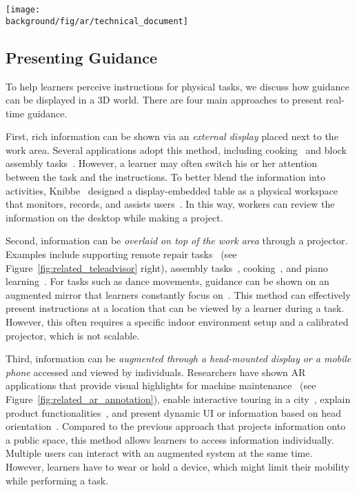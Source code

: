 \begin{figure*}[t!]
  \centering
  \texttt{[image: \\background/fig/ar/technical\_document]}
  \caption{Work by Mohr \ea{}~\cite{Mohr:2015:RTD:2702123.2702490} automatically analyzes a technical document and augments a machine with AR animation in 3D.}
  \label{fig:related_ar_annotation}
\end{figure*}

\subsection{Presenting Guidance}
To help learners perceive instructions for physical tasks, we discuss how guidance can be displayed in a 3D world. There are four main approaches to present real-time guidance.

First, rich information can be shown via an \emph{external display} placed next to the work area. Several applications adopt this method, including cooking~\cite{Uriu:2012:PRM:2207676.2207695} and block assembly tasks~\cite{Gupta2012DuploTrack,Wu:2016:ARI:2856400.2856416}. However, a learner may often switch his or her attention between the task and the instructions. To better blend the information into activities, Knibbe~\ea{} designed a display-embedded table as a physical workspace that monitors, records, and assists users~\cite{Knibbe:2015:SMI:2817721.2817741}. In this way, workers can review the information on the desktop while making a project.

Second, information can be \emph{overlaid on top of the work area} through a projector. Examples include supporting remote repair tasks~\cite{Gurevich:2012ko} (see Figure~\ref{fig:related_teleadvisor} right), assembly tasks~\cite{Kirk:2006:CRG:1124772.1124951}, cooking~\cite{Ju:2001:CIC:634067.634227}, and piano learning~\cite{Xiao:2016:IEI:2858036.2858577}.
%
For tasks such as dance movements, guidance can be shown on an augmented mirror that learners constantly focus on~\cite{Anderson:2013:YEM:2501988.2502045}.
%
This method can effectively present instructions at a location that can be viewed by a learner during a task. However, this often requires a specific indoor environment setup and a calibrated projector, which is not scalable.

Third, information can be \emph{augmented through a head-mounted display or a mobile phone} accessed and viewed by individuals. Researchers have shown AR applications that provide visual highlights for machine maintenance~\cite{Henderson:2011ff,Mohr:2015:RTD:2702123.2702490} (see Figure~\ref{fig:related_ar_annotation}), enable interactive touring in a city~\cite{Feiner1997}, explain product functionalities~\cite{MagicLens}, and present dynamic UI or information based on head orientation~\cite{Zhang:2014:HHO:2659766.2659773}.
%
Compared to the previous approach that projects information onto a public space, this method allows learners to access information individually. Multiple users can interact with an augmented system at the same time. However, learners have to wear or hold a device, which might limit their mobility while performing a task.

